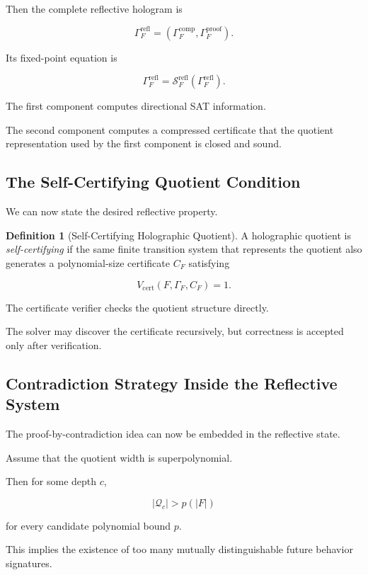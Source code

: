 \documentclass[11pt]{article}
\theoremstyle{plain}
\theoremstyle{definition}
\newtheorem{definition}[theorem]{Definition}
\begin{document}
Then the complete reflective hologram is

\[
\boxed{
\Gamma_F^{\mathrm{refl}}
=
\left(
    \Gamma_F^{\mathrm{comp}},
    \Gamma_F^{\mathrm{proof}}
\right).
}
\]

Its fixed-point equation is

\[
    \Gamma_F^{\mathrm{refl}}
    =
    \mathcal{S}_F^{\mathrm{refl}}
    \left(
        \Gamma_F^{\mathrm{refl}}
    \right).
\]

The first component computes directional SAT information.

The second component computes a compressed certificate that the quotient
representation used by the first component is closed and sound.

\subsection{The Self-Certifying Quotient Condition}

We can now state the desired reflective property.

\begin{definition}[Self-Certifying Holographic Quotient]
\label{def:self-certifying-quotient}
A holographic quotient is \emph{self-certifying} if the same finite
transition system that represents the quotient also generates a
polynomial-size certificate \(C_F\) satisfying

\[
    V_{\mathrm{cert}}
    (F,\Gamma_F,C_F)=1.
\]
\end{definition}

The certificate verifier checks the quotient structure directly.

The solver may discover the certificate recursively, but correctness is
accepted only after verification.

\subsection{Contradiction Strategy Inside the Reflective System}

The proof-by-contradiction idea can now be embedded in the reflective state.

Assume that the quotient width is superpolynomial.

Then for some depth \(c\),

\[
    |\mathcal{Q}_c|
    >
    p(|F|)
\]

for every candidate polynomial bound \(p\).

This implies the existence of too many mutually distinguishable future
behavior signatures.
\end{document}
